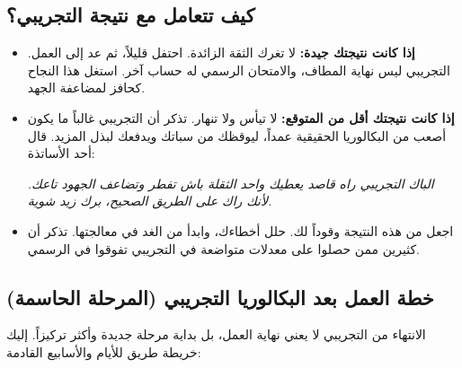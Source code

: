 \documentclass[12pt,a4paper]{book}
\newcommand{\quoteAr}[1]{%
	\begin{myquote}
		\itshape #1
	\end{myquote}
}
\begin{document}
	\subsection{كيف تتعامل مع نتيجة التجريبي؟}
		\label{sec:after-exams-reorganization1}
	
	\begin{itemize}
		\item \textbf{إذا كانت نتيجتك جيدة:} لا تغرك الثقة الزائدة. احتفل قليلاً، ثم عد إلى العمل. التجريبي ليس نهاية المطاف، والامتحان الرسمي له حساب آخر. استغل هذا النجاح كحافز لمضاعفة الجهد.
		\item \textbf{إذا كانت نتيجتك أقل من المتوقع:} لا تيأس ولا تنهار. تذكر أن التجريبي غالباً ما يكون أصعب من البكالوريا الحقيقية عمداً، ليوقظك من سباتك ويدفعك لبذل المزيد. قال أحد الأساتذة:
		\quoteAr{الباك التجريبي راه قاصد يعطيك واحد الثقلة باش تفطر وتضاعف الجهود تاعك. لأنك راك على الطريق الصحيح، برك زيد شوية.}
		\item اجعل من هذه النتيجة وقوداً لك. حلل أخطاءك، وابدأ من الغد في معالجتها. تذكر أن كثيرين ممن حصلوا على معدلات متواضعة في التجريبي تفوقوا في الرسمي.
	\end{itemize}
	
	\subsection{خطة العمل بعد البكالوريا التجريبي (المرحلة الحاسمة)}
	
	الانتهاء من التجريبي لا يعني نهاية العمل، بل بداية مرحلة جديدة وأكثر تركيزاً. إليك خريطة طريق للأيام والأسابيع القادمة:
	
\end{document}
